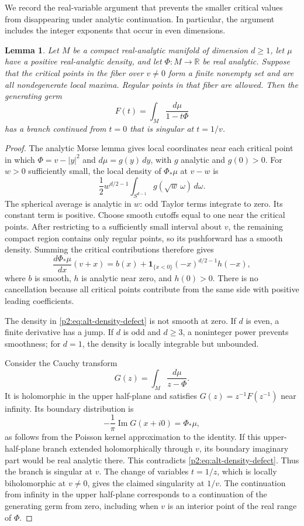 \documentclass[11pt,a4paper]{article}
\newtheorem{lemma}[theorem]{Lemma}
\theoremstyle{definition}
\theoremstyle{remark}
\numberwithin{equation}{section}
\begin{document}
We record the real-variable argument that prevents the smaller critical
values from disappearing under analytic continuation. In particular,
the argument includes the integer exponents that occur in even
dimensions.

\begin{lemma}\label{p2:lem:alt-visibility}
Let $M$ be a compact real-analytic manifold of dimension $d\geq1$, let
$\mu$ have a positive real-analytic density, and let $\Phi:M\to\mathbb R$
be real analytic. Suppose that the critical points in the fiber over
$v\ne0$ form a finite nonempty set and are all nondegenerate local
maxima. Regular points in that fiber are allowed. Then the generating
germ
\[
 F(t)=\int_M\frac{d\mu}{1-t\Phi}
\]
has a branch continued from $t=0$ that is singular at $t=1/v$.
\end{lemma}

\begin{proof}
The analytic Morse lemma gives local coordinates near each critical
point in which $\Phi=v-|y|^2$ and $d\mu=g(y)\,dy$, with $g$ analytic
and $g(0)>0$. For $w>0$ sufficiently small, the local density of
$\Phi_*\mu$ at $v-w$ is
\[
 \frac12w^{d/2-1}\int_{S^{d-1}}g(\sqrt w\,\omega)\,d\omega.
\]
The spherical average is analytic in $w$: odd Taylor terms integrate
to zero. Its constant term is positive. Choose smooth cutoffs equal
to one near the critical points. After restricting to a sufficiently
small interval about $v$, the remaining compact region contains only
regular points, so its pushforward has a smooth density. Summing the
critical contributions therefore gives
\begin{equation}\label{p2:eq:alt-density-defect}
 \frac{d\Phi_*\mu}{dx}(v+x)
 =b(x)+\mathbf 1_{\{x<0\}}(-x)^{d/2-1}h(-x),
\end{equation}
where $b$ is smooth, $h$ is analytic near zero, and $h(0)>0$.
There is no cancellation because all critical points contribute from
the same side with positive leading coefficients.

The density in \eqref{p2:eq:alt-density-defect} is not smooth at zero.
If $d$ is even, a finite derivative has a jump. If $d$ is odd and
$d\geq3$, a noninteger power prevents smoothness; for $d=1$, the
density is locally integrable but unbounded.

Consider the Cauchy transform
\[
 G(z)=\int_M\frac{d\mu}{z-\Phi}.
\]
It is holomorphic in the upper half-plane and satisfies
$G(z)=z^{-1}F(z^{-1})$ near infinity. Its boundary distribution is
\[
 -\frac1\pi\operatorname{Im}G(x+i0)=\Phi_*\mu,
\]
as follows from the Poisson kernel approximation to the identity.
If this upper-half-plane branch extended holomorphically through $v$,
its boundary imaginary part would be real analytic there. This
contradicts \eqref{p2:eq:alt-density-defect}. Thus the branch is singular
at $v$. The change of variables $t=1/z$, which is locally biholomorphic
at $v\ne0$, gives the claimed singularity at $1/v$. The continuation
from infinity in the upper half-plane corresponds to a continuation
of the generating germ from zero, including when $v$ is an interior
point of the real range of $\Phi$.
\end{proof}
\end{document}
